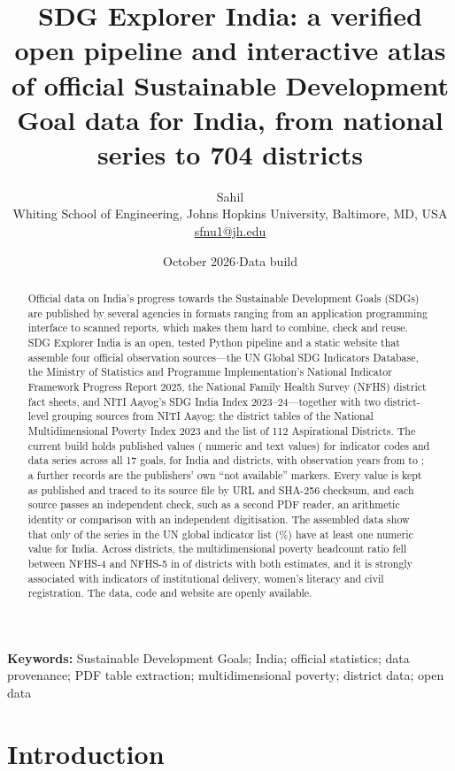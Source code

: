 \documentclass[11pt,a4paper]{article}
\title{\textbf{SDG Explorer India: a verified open pipeline and interactive atlas of official Sustainable Development Goal data for India, from national series to 704 districts}}
\author{Sahil\\[2pt]
\small Whiting School of Engineering, Johns Hopkins University, Baltimore, MD, USA\\
\small \href{mailto:sfnu1@jh.edu}{sfnu1@jh.edu}}
\date{\small October 2026\quad$\cdot$\quad Data build \buildDate}
\begin{document}
\maketitle

\begin{abstract}
\noindent
Official data on India's progress towards the Sustainable Development Goals (SDGs) are published by several agencies in formats ranging from an application programming interface to scanned reports, which makes them hard to combine, check and reuse. SDG Explorer India is an open, tested Python pipeline and a static website that assemble four official observation sources---the UN Global SDG Indicators Database, the Ministry of Statistics and Programme Implementation's National Indicator Framework Progress Report 2025, the National Family Health Survey (NFHS) district fact sheets, and NITI Aayog's SDG India Index 2023--24---together with two district-level grouping sources from NITI Aayog: the district tables of the National Multidimensional Poverty Index 2023 and the list of 112 Aspirational Districts. The current build holds \nObs{} published values (\nNumeric{} numeric and \nText{} text values) for \nIndicators{} indicator codes and \nSeries{} data series across all 17 goals, for India and \nDistricts{} districts, with observation years from \yFirst{} to \yLast{}; a further \nNA{} records are the publishers' own ``not available'' markers. Every value is kept as published and traced to its source file by URL and SHA-256 checksum, and each source passes an independent check, such as a second PDF reader, an arithmetic identity or comparison with an independent digitisation. The assembled data show that only \unWithNum{} of the \unListed{} series in the UN global indicator list (\unShare\%) have at least one numeric value for India. Across districts, the multidimensional poverty headcount ratio fell between NFHS-4 and NFHS-5 in \hDeclined{} of \hPairN{} districts with both estimates, and it is strongly associated with indicators of institutional delivery, women's literacy and civil registration. The data, code and website are openly available.
\end{abstract}

\noindent\textbf{Keywords:} Sustainable Development Goals; India; official statistics; data provenance; PDF table extraction; multidimensional poverty; district data; open data

\section{Introduction}
\end{document}
